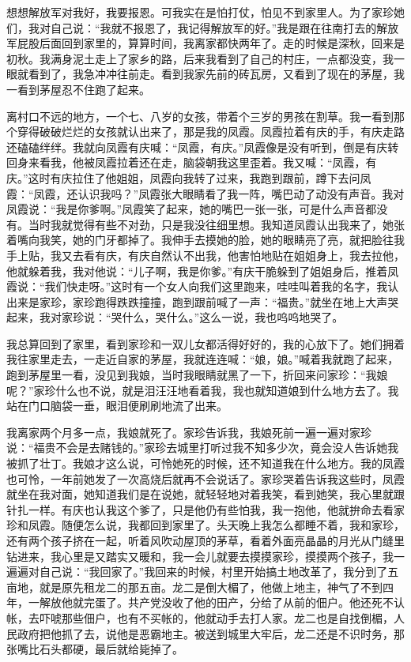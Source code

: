 \documentclass[12pt,UTF8]{ctexbook}
\begin{document}
想想解放军对我好，我要报恩。可我实在是怕打仗，怕见不到家里人。为了家珍她们，我对自己说：“我就不报恩了，我记得解放军的好。”我是跟在往南打去的解放军屁股后面回到家里的，算算时间，我离家都快两年了。走的时候是深秋，回来是初秋。我满身泥土走上了家乡的路，后来我看到了自己的村庄，一点都没变，我一眼就看到了，我急冲冲往前走。看到我家先前的砖瓦房，又看到了现在的茅屋，我一看到茅屋忍不住跑了起来。

离村口不远的地方，一个七、八岁的女孩，带着个三岁的男孩在割草。我一看到那个穿得破破烂烂的女孩就认出来了，那是我的凤霞。凤霞拉着有庆的手，有庆走路还磕磕绊绊。我就向凤霞有庆喊：“凤霞，有庆。”凤霞像是没有听到，倒是有庆转回身来看我，他被凤霞拉着还在走，脑袋朝我这里歪着。我又喊：“凤霞，有庆。”这时有庆拉住了他姐姐，凤霞向我转了过来，我跑到跟前，蹲下去问凤霞：“凤霞，还认识我吗？”凤霞张大眼睛看了我一阵，嘴巴动了动没有声音。我对凤霞说：“我是你爹啊。”凤霞笑了起来，她的嘴巴一张一张，可是什么声音都没有。当时我就觉得有些不对劲，只是我没往细里想。我知道凤霞认出我来了，她张着嘴向我笑，她的门牙都掉了。我伸手去摸她的脸，她的眼睛亮了亮，就把脸往我手上贴，我又去看有庆，有庆自然认不出我，他害怕地贴在姐姐身上，我去拉他，他就躲着我，我对他说：“儿子啊，我是你爹。”有庆干脆躲到了姐姐身后，推着凤霞说：“我们快走呀。”这时有一个女人向我们这里跑来，哇哇叫着我的名字，我认出来是家珍，家珍跑得跌跌撞撞，跑到跟前喊了一声：“福贵。”就坐在地上大声哭起来，我对家珍说：“哭什么，哭什么。”这么一说，我也呜呜地哭了。

我总算回到了家里，看到家珍和一双儿女都活得好好的，我的心放下了。她们拥着我往家里走去，一走近自家的茅屋，我就连连喊：“娘，娘。”喊着我就跑了起来，跑到茅屋里一看，没见到我娘，当时我眼睛就黑了一下，折回来问家珍：“我娘呢？”家珍什么也不说，就是泪汪汪地看着我，我也就知道娘到什么地方去了。我站在门口脑袋一垂，眼泪便刷刷地流了出来。

我离家两个月多一点，我娘就死了。家珍告诉我，我娘死前一遍一遍对家珍说：“福贵不会是去赌钱的。”家珍去城里打听过我不知多少次，竟会没人告诉她我被抓了壮丁。我娘才这么说，可怜她死的时候，还不知道我在什么地方。我的凤霞也可怜，一年前她发了一次高烧后就再不会说话了。家珍哭着告诉我这些时，凤霞就坐在我对面，她知道我们是在说她，就轻轻地对着我笑，看到她笑，我心里就跟针扎一样。有庆也认我这个爹了，只是他仍有些怕我，我一抱他，他就拚命去看家珍和凤霞。随便怎么说，我都回到家里了。头天晚上我怎么都睡不着，我和家珍，还有两个孩子挤在一起，听着风吹动屋顶的茅草，看着外面亮晶晶的月光从门缝里钻进来，我心里是又踏实又暖和，我一会儿就要去摸摸家珍，摸摸两个孩子，我一遍遍对自己说：“我回家了。”我回来的时候，村里开始搞土地改革了，我分到了五亩地，就是原先租龙二的那五亩。龙二是倒大楣了，他做上地主，神气了不到四年，一解放他就完蛋了。共产党没收了他的田产，分给了从前的佃户。他还死不认帐，去吓唬那些佃户，也有不买帐的，他就动手去打人家。龙二也是自找倒楣，人民政府把他抓了去，说他是恶霸地主。被送到城里大牢后，龙二还是不识时务，那张嘴比石头都硬，最后就给毙掉了。
\end{document}
